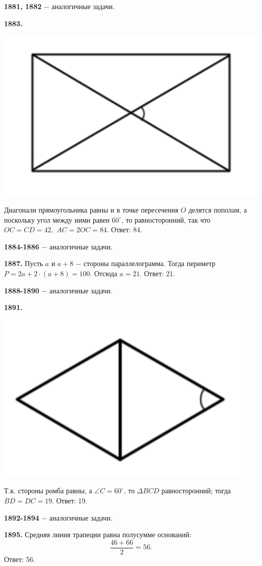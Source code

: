 \textbf{1881, 1882} $-$ аналогичные задачи.

\textbf{1883.}

{\centering \includegraphics[width=0.5\linewidth]{Geometry/Content/23.png}
	
}

Диагонали прямоугольника равны и в точке пересечения $O$ делятся пополам, а поскольку угол между ними равен $60^\circ$, то   равносторонний, так что $OC = CD = 42,$ $AC= 2OC = 84$. \newline \null \hspace*{\fill} Ответ: 84.

\textbf{1884-1886} $-$ аналогичные задачи.

\textbf{1887.} Пусть $a$ и $a+8$ $-$ стороны параллелограмма. Тогда периметр $P = 2a + 2\cdot(a+8)=100.$
Отсюда $a = 21$. \newline \null \hspace*{\fill} Ответ: 21. 

\textbf{1888-1890} $-$ аналогичные задачи.

\textbf{1891.}

{\centering \includegraphics[width=0.4\linewidth]{Geometry/Content/24.png}
	
}

Т.к. стороны ромба равны, а $\angle C = 60^\circ$, то $\Delta BCD$ равносторонний; тогда $BD = DC = 19$. \newline \null \hspace*{\fill} Ответ: 19.  

\textbf{1892-1894} $-$ аналогичные задачи.

\textbf{1895.} Средняя линия трапеции равна полусумме оснований: 
\[\frac{46+66}{2} = 56.\] \null \hspace*{\fill} Ответ: 56.

